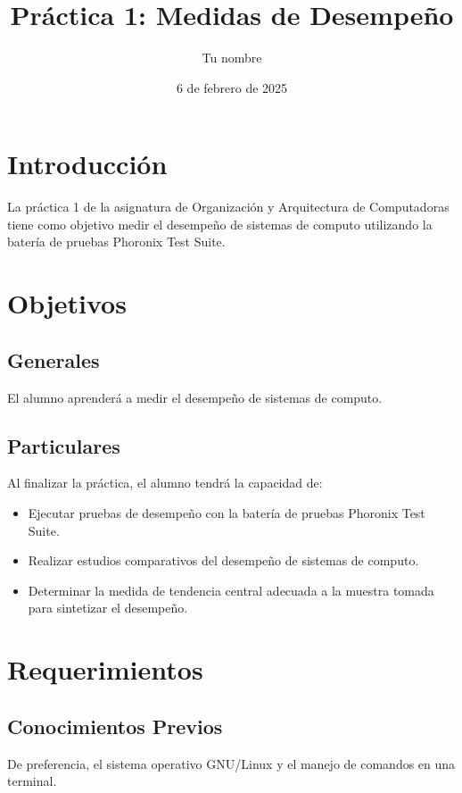 \documentclass{article}
\title{Práctica 1: Medidas de Desempeño}
\author{Tu nombre}
\date{6 de febrero de 2025}
\begin{document}
\maketitle

\section{Introducción}

La práctica 1 de la asignatura de Organización y Arquitectura de Computadoras tiene como objetivo medir el desempeño de sistemas de computo utilizando la batería de pruebas Phoronix Test Suite.

\section{Objetivos}

\subsection{Generales}

El alumno aprenderá a medir el desempeño de sistemas de computo.

\subsection{Particulares}

Al finalizar la práctica, el alumno tendrá la capacidad de:

\begin{itemize}
\item Ejecutar pruebas de desempeño con la batería de pruebas Phoronix Test Suite.
\item Realizar estudios comparativos del desempeño de sistemas de computo.
\item Determinar la medida de tendencia central adecuada a la muestra tomada para sintetizar el desempeño.
\end{itemize}

\section{Requerimientos}

\subsection{Conocimientos Previos}

De preferencia, el sistema operativo GNU/Linux y el manejo de comandos en una terminal.
\end{document}
